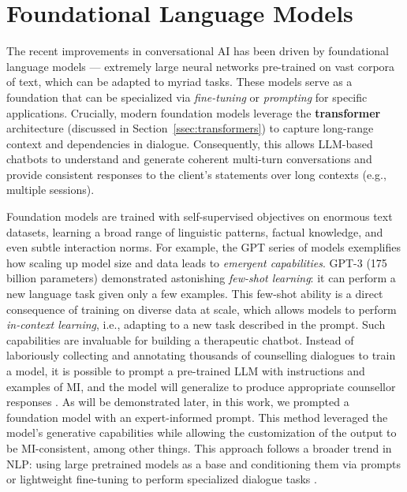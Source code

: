 \section{Foundational Language Models} \label{sec:foundational_models}
The recent improvements in conversational AI has been driven by foundational language models \cite{stanfordCRFM2021} --- extremely large neural networks pre-trained on vast corpora of text, which can be adapted to myriad tasks. These models serve as a foundation that can be specialized via \emph{fine-tuning} or \emph{prompting} for specific applications. Crucially, modern foundation models leverage the \textbf{transformer} architecture (discussed in Section~\ref{ssec:transformers}) to capture long-range context and dependencies in dialogue. Consequently, this allows LLM-based chatbots to understand and generate coherent multi-turn conversations and provide consistent responses to the client's statements over long contexts (e.g., multiple sessions).

Foundation models are trained with self-supervised objectives on enormous text datasets, learning a broad range of linguistic patterns, factual knowledge, and even subtle interaction norms. For example, the GPT series of models exemplifies how scaling up model size and data leads to \emph{emergent capabilities}. GPT-3 \cite{brown2020language} (175 billion parameters) demonstrated astonishing \emph{few-shot learning}: it can perform a new language task given only a few examples. This few-shot ability is a direct consequence of training on diverse data at scale, which allows models to perform \emph{in-context learning}, i.e., adapting to a new task described in the prompt. Such capabilities are invaluable for building a therapeutic chatbot. Instead of laboriously collecting and annotating thousands of counselling dialogues to train a model, it is possible to prompt a pre-trained LLM with instructions and examples of MI, and the model will generalize to produce appropriate counsellor responses \cite{xie-etal-2024-shot-dialogue}. As will be demonstrated later, in this work, we prompted a foundation model with an expert-informed prompt. This method leveraged the model's generative capabilities while allowing the customization of the output to be MI-consistent, among other things. This approach follows a broader trend in NLP: using large pretrained models as a base and conditioning them via prompts or lightweight fine-tuning to perform specialized dialogue tasks \cite{10.5555/3600270.3602070}.


